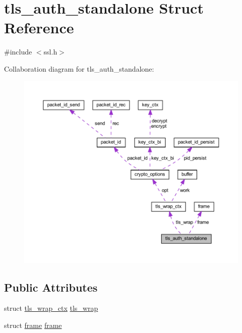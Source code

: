 \hypertarget{structtls__auth__standalone}{}\section{tls\+\_\+auth\+\_\+standalone Struct Reference}
\label{structtls__auth__standalone}


{\ttfamily \#include $<$ssl.\+h$>$}



Collaboration diagram for tls\+\_\+auth\+\_\+standalone\+:
\nopagebreak
\begin{figure}[H]
\begin{center}
\leavevmode
\includegraphics[width=350pt]{structtls__auth__standalone__coll__graph}
\end{center}
\end{figure}
\subsection*{Public Attributes}
\begin{DoxyCompactItemize}
\item 
struct \hyperlink{structtls__wrap__ctx}{tls\+\_\+wrap\+\_\+ctx} \hyperlink{structtls__auth__standalone_af260bc1e93fde8eb3368cbd78de45f38}{tls\+\_\+wrap}
\item 
struct \hyperlink{structframe}{frame} \hyperlink{structtls__auth__standalone_a72cf30b064c14558ff2e61212cc0c33c}{frame}
\end{DoxyCompactItemize}



